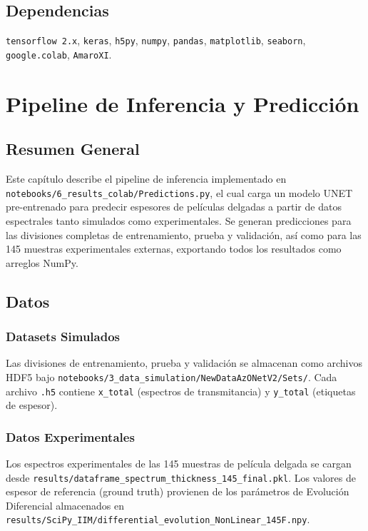 \documentclass{article}
\begin{document}
\subsection{Dependencias}
\texttt{tensorflow 2.x}, \texttt{keras}, \texttt{h5py}, \texttt{numpy}, \texttt{pandas}, \texttt{matplotlib}, \texttt{seaborn}, \texttt{google.colab}, \texttt{AmaroXI}.

\newpage

\section{Pipeline de Inferencia y Predicción}
\label{sec:inference}

\subsection{Resumen General}

Este capítulo describe el pipeline de inferencia implementado en \texttt{notebooks/6\_results\_colab/Predictions.py}, el cual carga un modelo UNET pre-entrenado para predecir espesores de películas delgadas a partir de datos espectrales tanto simulados como experimentales. Se generan predicciones para las divisiones completas de entrenamiento, prueba y validación, así como para las 145 muestras experimentales externas, exportando todos los resultados como arreglos NumPy.

\subsection{Datos}

\subsubsection{Datasets Simulados}
Las divisiones de entrenamiento, prueba y validación se almacenan como archivos HDF5 bajo \texttt{notebooks/3\_data\_simulation/NewDataAzONetV2/Sets/}. Cada archivo \texttt{.h5} contiene \texttt{x\_total} (espectros de transmitancia) y \texttt{y\_total} (etiquetas de espesor).

\subsubsection{Datos Experimentales}
Los espectros experimentales de las 145 muestras de película delgada se cargan desde \texttt{results/dataframe\_spectrum\_thickness\_145\_final.pkl}. Los valores de espesor de referencia (ground truth) provienen de los parámetros de Evolución Diferencial almacenados en \texttt{results/SciPy\_IIM/differential\_evolution\_NonLinear\_145F.npy}.
\end{document}
